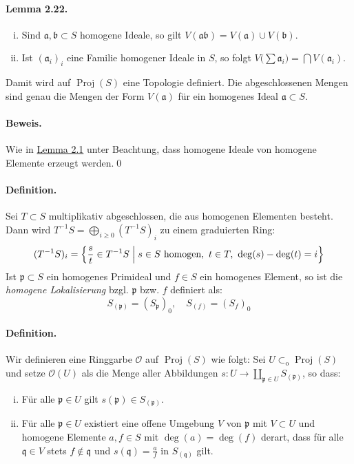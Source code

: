 \paragraph{Lemma 2.22.}\label{2.22}\begin{enumerate}[(i)]
\item Sind $\mathfrak{a},\mathfrak{b}\subset S$ homogene Ideale, so gilt $V(\mathfrak{ab})=V(\mathfrak{a})\cup V(\mathfrak{b})$.
\item Ist $(\mathfrak{a}_i)_i$ eine Familie homogener Ideale in $S$, so folgt $V\big(\sum\mathfrak{a}_i\big)=\bigcap V(\mathfrak{a}_i)$.
\end{enumerate}
Damit wird auf $\operatorname{Proj}(S)$ eine Topologie definiert. Die abgeschlossenen Mengen sind genau die Mengen der Form $V(\mathfrak{a})$ für ein homogenes Ideal $\mathfrak{a}\subset S$.

\paragraph{Beweis.} Wie in \hyperref[2.1]{Lemma 2.1} unter Beachtung, dass homogene Ideale von homogene Elemente erzeugt werden.\qed

\paragraph{Definition.} Sei $T\subset S$ multiplikativ abgeschlossen, die aus homogenen Elementen besteht. Dann wird $T^{-1}S = \bigoplus_{i\geq 0} (T^{-1}S)_i$ zu einem graduierten Ring:
\[(T^{-1}S)_i=\Big\{\frac{s}{t}\in T^{-1}S\Bigm| s\in S\text{ homogen},\ t\in T,\ \deg(s)-\deg(t)=i \Big\} \]
Ist $\mathfrak{p}\subset S$ ein homogenes Primideal und $f\in S$ ein homogenes Element, so ist die \textit{homogene Lokalisierung} bzgl. $\mathfrak{p}$ bzw. $f$ definiert als:
\[S_{(\mathfrak{p})} = (S_\mathfrak{p})_0,\quad S_{(f)} = (S_f)_0 \]

\paragraph{Definition.} Wir definieren eine Ringgarbe $\mathcal{O}$ auf $\operatorname{Proj}(S)$ wie folgt: Sei $U\subset_\text{o}\operatorname{Proj}(S)$ und setze $\mathcal{O}(U)$ als die Menge aller Abbildungen $s:U\to\coprod_{\mathfrak{p}\in U}S_{(\mathfrak{p})}$, so dass:
\begin{enumerate}[(i)]
\item Für alle $\mathfrak{p}\in U$ gilt $s(\mathfrak{p})\in S_{(\mathfrak{p})}$.
\item Für alle $\mathfrak{p}\in U$ existiert eine offene Umgebung $V$ von $\mathfrak{p}$ mit $V\subset U$ und homogene Elemente $a,f\in S$ mit $\deg(a)=\deg(f)$ derart, dass für alle $\mathfrak{q}\in V$ stets $f\not\in\mathfrak{q}$ und $s(\mathfrak{q})=\frac{a}{f}$ in $S_{(\mathfrak{q})}$ gilt.
\end{enumerate}

